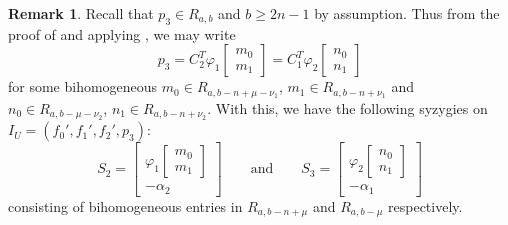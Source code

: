 \documentclass[reqno]{amsart}
\numberwithin{equation}{section}
\theoremstyle{definition}
\newtheorem{rem}[thm]{Remark}
\def\m{\mathfrak{m}}
\begin{document}
\begin{rem}\label{dim 3 -- new syzygies remark}
Recall that $p_3 \in R_{a,b}$ and $b\geq 2n-1$ by assumption. Thus from the proof of  and applying , we may write
\begin{equation}\label{dim 3 - p_3 decomp}
p_3= C_2^T\varphi_1 \begin{bmatrix}
    m_0\\m_1
\end{bmatrix}= C_1^T\varphi_2 \begin{bmatrix}
    n_0\\n_1
\end{bmatrix}    
\end{equation}
for some bihomogeneous $m_0 \in R_{a,b-n+\mu-\nu_1}$, $m_1\in R_{a,b-n+\nu_1}$ and $n_0\in R_{a,b-\mu-\nu_2}$, $n_1\in R_{a,b-n+\nu_2}$. With this, we have the following syzygies on $I_U=(f_0',f_1',f_2',p_3)$:
\begin{equation}\label{dim 3 - Syzygies S_2 and S_3}
S_2=\left[
\begin{array}{c}
     \varphi_1\begin{bmatrix}
         m_0\\m_1
     \end{bmatrix}  \\[2ex]
      \hline
      -\alpha_2
\end{array}
\right]
\quad\quad\text{and}\quad\quad S_3=\left[
\begin{array}{c}
     \varphi_2\begin{bmatrix}
         n_0\\n_1
     \end{bmatrix}  \\[2ex]
      \hline
      -\alpha_1
\end{array}
\right]
\end{equation}
consisting of bihomogeneous entries in $R_{a,b-n+\mu}$ and $R_{a,b-\mu}$ respectively.
\end{rem}
\end{document}

